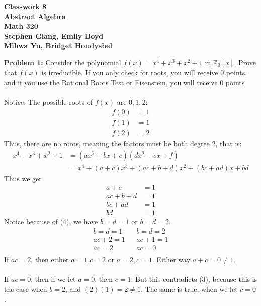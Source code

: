 \documentclass[12pt]{article}
\begin{document}
	
	\begin{center}
		\textbf{Classwork 8} \\
		\textbf{Abstract Algebra} \\
		\textbf{Math 320} \\
		\textbf{Stephen Giang, Emily Boyd} \\
		\textbf{Mihwa Yu, Bridget Houdyshel} \\ 
	\end{center}

\vspace{\baselineskip}

\noindent \textbf{Problem 1: }Consider the polynomial $f(x) = x^4 + x^3 + x^2 + 1$ in $\mathbb{Z}_3[x]$. Prove that $f(x)$ is irreducible. If you only check for roots, you will receive 0 points, and if you use the Rational Roots Test or Eisenstein, you will receive 0 points
\\ \\
Notice: The possible roots of $f(x)$ are $0,1,2$:
	\begin{align*}
		f(0) &= 1 \\
		f(1) &= 1 \\
		f(2) &= 2
	\end{align*}
Thus, there are no roots, meaning the factors must be both degree $2$, that is:
	\begin{align*}
		x^4 + x^3 + x^2 + 1 &= (ax^2 + bx + c)(dx^2+ex+f) \\
		&= x^4 + (a+c)x^3 + (ac + b + d)x^2 + (bc + ad)x + bd
	\end{align*}
Thus we get 
	\begin{align}
		a + c &= 1 \\
		ac + b + d &= 1 \\
		bc + ad &= 1 \\
		bd &= 1
	\end{align}
Notice because of (4), we have $b=d=1$ or $b=d=2$. 
	\begin{align*}
		b = d = 1 && b = d = 2 \\
		ac + 2 = 1 && ac + 1 = 1 \\
		ac = 2 && ac = 0 \\
	\end{align*}
If $ac = 2$, then either $a=1$,$c=2$ or $a=2,c=1$.  Either way $a+c = 0 \not = 1$.
\\ \\
If $ac = 0$, then if we let $a = 0$, then $c=1$. But this contradicts (3), because this is the case when $b=2$, and $(2)(1) = 2 \not = 1$.  The same is true, when we let $c = 0$. 
\end{document}
